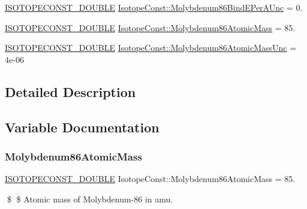 \begin{DoxyCompactItemize}
\mbox{\hyperlink{group___isotope_const-_macros_ga8f45a7272ce02c0b4c65c44636ed719a}{I\+S\+O\+T\+O\+P\+E\+C\+O\+N\+S\+T\+\_\+\+D\+O\+U\+B\+LE}} \mbox{\hyperlink{group___isotope_const-_molybdenum-_mo86_ga0853f345ca12dbe88409d9880e8b412a}{Isotope\+Const\+::\+Molybdenum86\+Bind\+E\+Per\+A\+Unc}} = 0.
\item 
\mbox{\hyperlink{group___isotope_const-_macros_ga8f45a7272ce02c0b4c65c44636ed719a}{I\+S\+O\+T\+O\+P\+E\+C\+O\+N\+S\+T\+\_\+\+D\+O\+U\+B\+LE}} \mbox{\hyperlink{group___isotope_const-_molybdenum-_mo86_ga971528395f0d4a15c99fb1c1052d2d13}{Isotope\+Const\+::\+Molybdenum86\+Atomic\+Mass}} = 85.
\item 
\mbox{\hyperlink{group___isotope_const-_macros_ga8f45a7272ce02c0b4c65c44636ed719a}{I\+S\+O\+T\+O\+P\+E\+C\+O\+N\+S\+T\+\_\+\+D\+O\+U\+B\+LE}} \mbox{\hyperlink{group___isotope_const-_molybdenum-_mo86_ga902aa90e635359105d24c558ed9aa5e5}{Isotope\+Const\+::\+Molybdenum86\+Atomic\+Mass\+Unc}} = 4e-\/06
\end{DoxyCompactItemize}


\subsection{Detailed Description}


\subsection{Variable Documentation}
\mbox{\label{group___isotope_const-_molybdenum-_mo86_ga971528395f0d4a15c99fb1c1052d2d13}} 
\subsubsection{\texorpdfstring{Molybdenum86\+Atomic\+Mass}{Molybdenum86AtomicMass}}
{\footnotesize\ttfamily \mbox{\hyperlink{group___isotope_const-_macros_ga8f45a7272ce02c0b4c65c44636ed719a}{I\+S\+O\+T\+O\+P\+E\+C\+O\+N\+S\+T\+\_\+\+D\+O\+U\+B\+LE}} Isotope\+Const\+::\+Molybdenum86\+Atomic\+Mass = 85.}

\$ \$ Atomic mass of Molybdenum-\/86 in amu. \mbox{\label{group___isotope_const-_molybdenum-_mo86_ga902aa90e635359105d24c558ed9aa5e5}} 
